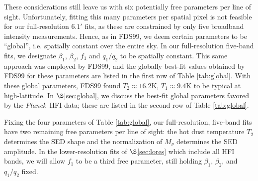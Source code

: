\documentclass{emulateapj}
\newcommand{\PLANCK}{{\it Planck}}
\begin{document}
These considerations still leave us with six potentially free parameters per 
line of sight. Unfortunately, fitting this many parameters per spatial pixel is
not feasible for our full-resolution $6.1$$'$ fits, as these are constrained by
only five broadband intensity measurements. Hence, as in FDS99, we 
deem certain parameters to be ``global'', i.e. spatially constant over the 
entire sky. In our full-resolution five-band fits, we designate $\beta_1$, 
$\beta_2$, $f_1$ and $q_1/q_2$ to be spatially constant. This same approach 
was employed by FDS99, and the globally best-fit values obtained by FDS99 for 
these parameters are listed in the first row of Table \ref{tab:global}. With 
these global parameters, FDS99 found $T_2$$\approx$$16.2$K, 
$T_1$$\approx$$9.4$K to be typical at high-latitude. In $\S$\ref{sec:global}, 
we discuss the best-fit global parameters favored by the \PLANCK~HFI data; 
these are listed in the second row of Table \ref{tab:global}.

Fixing the four parameters of Table \ref{tab:global}, our full-resolution, 
five-band fits have two remaining free parameters per line of sight: the hot 
dust temperature $T_2$ determines the SED shape and the normalization of 
$M_{\nu}$ determines the SED amplitude. In the lower-resolution fits of 
$\S$\ref{sec:lores} which include all HFI bands, we will allow $f_1$ to be a 
third free parameter, still holding $\beta_1$, $\beta_2$, and $q_1/q_2$ fixed.


% 




\end{document}
